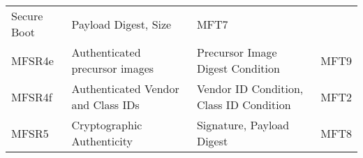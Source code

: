\begin{longtable}[]{@{}llll@{}}
\begin{minipage}[t]{0.29\columnwidth}
Secure Boot\strut
\end{minipage} & \begin{minipage}[t]{0.34\columnwidth}\raggedright\strut
Payload Digest, Size\strut
\end{minipage} & \begin{minipage}[t]{0.10\columnwidth}\raggedright\strut
MFT7\strut
\end{minipage}\tabularnewline
\begin{minipage}[t]{0.16\columnwidth}\raggedright\strut
MFSR4e\strut
\end{minipage} & \begin{minipage}[t]{0.29\columnwidth}\raggedright\strut
Authenticated precursor images\strut
\end{minipage} & \begin{minipage}[t]{0.34\columnwidth}\raggedright\strut
Precursor Image Digest Condition\strut
\end{minipage} & \begin{minipage}[t]{0.10\columnwidth}\raggedright\strut
MFT9\strut
\end{minipage}\tabularnewline
\begin{minipage}[t]{0.16\columnwidth}\raggedright\strut
MFSR4f\strut
\end{minipage} & \begin{minipage}[t]{0.29\columnwidth}\raggedright\strut
Authenticated Vendor and Class IDs\strut
\end{minipage} & \begin{minipage}[t]{0.34\columnwidth}\raggedright\strut
Vendor ID Condition, Class ID Condition\strut
\end{minipage} & \begin{minipage}[t]{0.10\columnwidth}\raggedright\strut
MFT2\strut
\end{minipage}\tabularnewline
\begin{minipage}[t]{0.16\columnwidth}\raggedright\strut
MFSR5\strut
\end{minipage} & \begin{minipage}[t]{0.29\columnwidth}\raggedright\strut
Cryptographic Authenticity\strut
\end{minipage} & \begin{minipage}[t]{0.34\columnwidth}\raggedright\strut
Signature, Payload Digest\strut
\end{minipage} & \begin{minipage}[t]{0.10\columnwidth}\raggedright\strut
MFT8\strut
\end{minipage}\tabularnewline

\end{longtable}
